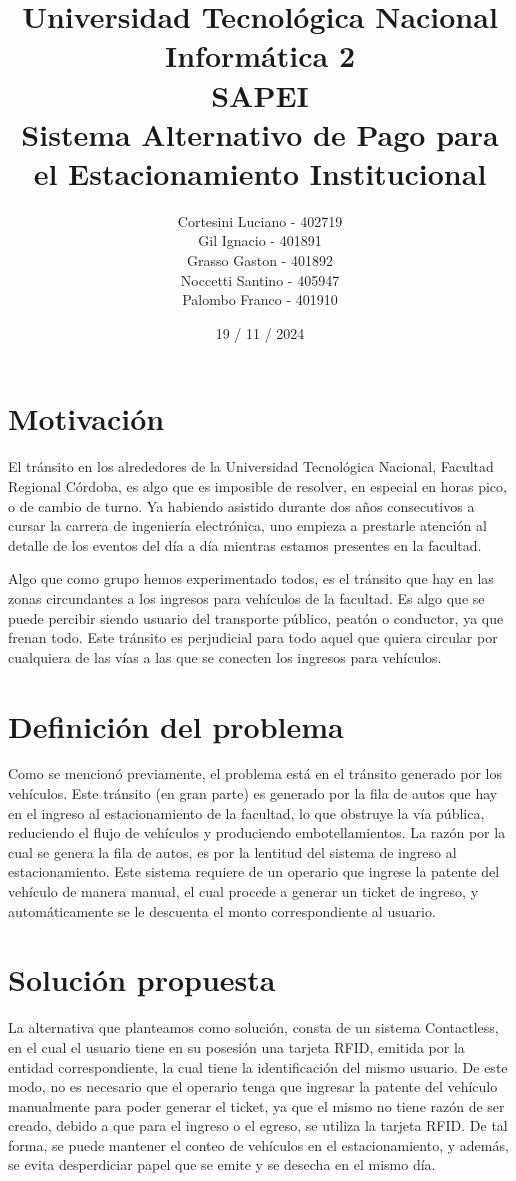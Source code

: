\documentclass[a4paper, 12pt]{report}
\title{%
  \fontsize{25}{0}\selectfont Universidad Tecnológica Nacional \\
  \fontsize{22}{30}\selectfont Informática 2 \\
  \fontsize{18}{25}\selectfont SAPEI\\
  \fontsize{16}{20}\selectfont Sistema Alternativo de Pago para el Estacionamiento Institucional\\
}
\author{
Cortesini Luciano - 402719\\
Gil Ignacio - 401891\\
Grasso Gaston - 401892\\
Noccetti Santino - 405947 \\
Palombo Franco - 401910
}
\date{19 / 11 / 2024}
\begin{document}
\maketitle
\section{Motivación}
    El tránsito en los alrededores de la Universidad Tecnológica Nacional, Facultad Regional Córdoba, es algo que es
    imposible de resolver, en especial en horas pico, o de cambio de turno. Ya habiendo asistido durante dos años
    consecutivos a cursar la carrera de ingeniería electrónica, uno empieza a prestarle atención al detalle de los
    eventos del día a día mientras estamos presentes en la facultad.

    Algo que como grupo hemos experimentado todos, es el tránsito que hay en las zonas circundantes a los ingresos
    para vehículos de la facultad. Es algo que se puede percibir siendo usuario del transporte público, peatón o
    conductor, ya que frenan todo. Este tránsito es perjudicial para todo aquel que quiera circular por cualquiera
    de las vías a las que se conecten los ingresos para vehículos.

\section{Definición del problema}
    Como se mencionó previamente, el problema está en el tránsito generado por los vehículos. Este tránsito (en gran
    parte) es generado por la fila de autos que hay en el ingreso al estacionamiento de la facultad, lo que obstruye
    la vía pública, reduciendo el flujo de vehículos y produciendo embotellamientos. La razón por la cual se genera la
    fila de autos, es por la lentitud del sistema de ingreso al estacionamiento. Este sistema requiere de un operario
    que ingrese la patente del vehículo de manera manual, el cual procede a generar un ticket de ingreso, y
    automáticamente se le descuenta el monto correspondiente al usuario.

\section{Solución propuesta}
    La alternativa que planteamos como solución, consta de un sistema Contactless, en el cual el usuario tiene en su
    posesión una tarjeta RFID, emitida por la entidad correspondiente, la cual tiene la identificación del mismo
    usuario. De este modo, no es necesario que el operario tenga que ingresar la patente del vehículo manualmente para
    poder generar el ticket, ya que el mismo no tiene razón de ser creado, debido a que para el ingreso o el egreso,
    se utiliza la tarjeta RFID. De tal forma, se puede mantener el conteo de vehículos en el estacionamiento, y además,
    se evita desperdiciar papel que se emite y se desecha en el mismo día.
\end{document}

